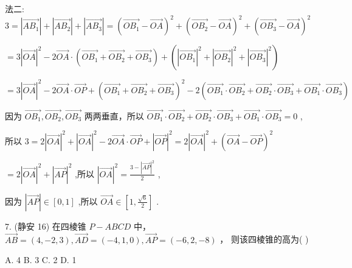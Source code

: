 \documentclass[10pt]{article}
\begin{document}
法二: \(3 = \left| \overrightarrow{A{B}_{1}}\right|  + \left| \overrightarrow{A{B}_{2}}\right|  + \left| \overrightarrow{A{B}_{3}}\right|  = {\left( \overrightarrow{O{B}_{1}} - \overrightarrow{OA}\right) }^{2} + {\left( \overrightarrow{O{B}_{2}} - \overrightarrow{OA}\right) }^{2} + {\left( \overrightarrow{O{B}_{3}} - \overrightarrow{OA}\right) }^{2}\)

\(= 3{\left| \overrightarrow{OA}\right| }^{2} - 2\overrightarrow{OA} \cdot  \left( {\overrightarrow{O{B}_{1}} + \overrightarrow{O{B}_{2}} + \overrightarrow{O{B}_{3}}}\right)  + \left( {{\left| \overrightarrow{O{B}_{1}}\right| }^{2} + {\left| \overrightarrow{O{B}_{2}}\right| }^{2} + {\left| \overrightarrow{O{B}_{3}}\right| }^{2}}\right)\)

\(= 3{\left| \overrightarrow{OA}\right| }^{2} - 2\overrightarrow{OA} \cdot  \overrightarrow{OP} + {\left( \overrightarrow{O{B}_{1}} + \overrightarrow{O{B}_{2}} + \overrightarrow{O{B}_{3}}\right) }^{2} - 2\left( {\overrightarrow{O{B}_{1}} \cdot  \overrightarrow{O{B}_{2}} + \overrightarrow{O{B}_{2}} \cdot  \overrightarrow{O{B}_{3}} + \overrightarrow{O{B}_{1}} \cdot  \overrightarrow{O{B}_{3}}}\right)\)

因为 \(\overrightarrow{O{B}_{1}},\overrightarrow{O{B}_{2}},\overrightarrow{O{B}_{3}}\) 两两垂直，所以 \(\overrightarrow{O{B}_{1}} \cdot  \overrightarrow{O{B}_{2}} + \overrightarrow{O{B}_{2}} \cdot  \overrightarrow{O{B}_{3}} + \overrightarrow{O{B}_{1}} \cdot  \overrightarrow{O{B}_{3}} = 0\) ,

所以 \(3 = 2{\left| \overrightarrow{OA}\right| }^{2} + {\left| \overrightarrow{OA}\right| }^{2} - 2\overrightarrow{OA} \cdot  \overrightarrow{OP} + {\left| \overrightarrow{OP}\right| }^{2} = 2{\left| \overrightarrow{OA}\right| }^{2} + {\left( \overrightarrow{OA} - \overrightarrow{OP}\right) }^{2}\)

\(= 2{\left| \overrightarrow{OA}\right| }^{2} + {\left| \overrightarrow{AP}\right| }^{2}\) ,所以 \({\left| \overrightarrow{OA}\right| }^{2} = \frac{3 - {\left| \overrightarrow{AP}\right| }^{2}}{2}\) ,

因为 \(\left| \overrightarrow{AP}\right|  \in  \left\lbrack  {0,1}\right\rbrack\) ,所以 \(\overrightarrow{OA} \in  \left\lbrack  {1,\frac{\sqrt{6}}{2}}\right\rbrack\) .

7. (静安 16) 在四棱锥 \(P - {ABCD}\) 中， \(\overrightarrow{AB} = \left( {4, - 2,3}\right) ,\overrightarrow{AD} = \left( {-4,1,0}\right) ,\overrightarrow{AP} = \left( {-6,2, - 8}\right)\) ， 则该四棱锥的高为( )

A. 4 B. 3 C. 2 D. 1
\end{document}
